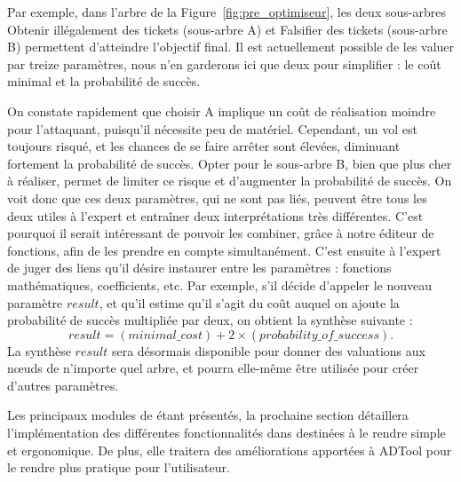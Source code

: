             Par exemple, dans l'arbre de la {\sc Figure}~\ref{fig:pre_optimiseur}, les deux sous-arbres \og Obtenir illégalement des tickets \fg{} (sous-arbre A) et \og Falsifier des tickets \fg{} (sous-arbre B) permettent d'atteindre l'objectif final. Il est actuellement possible de les valuer par treize paramètres, nous n'en garderons ici que deux pour simplifier : le coût minimal et la probabilité de succès.

            On constate rapidement que choisir A implique un coût de réalisation moindre pour l'attaquant, puisqu'il nécessite peu de matériel. Cependant, un vol est toujours risqué, et les chances de se faire arrêter sont élevées, diminuant fortement la probabilité de succès. Opter pour le sous-arbre B, bien que plus cher à réaliser, permet de limiter ce risque et d'augmenter la probabilité de succès. On voit donc que ces deux paramètres, qui ne sont pas liés, peuvent être tous les deux utiles à l'expert et entraîner deux interprétations très différentes. C'est pourquoi il serait intéressant de pouvoir les combiner, grâce à notre éditeur de fonctions, afin de les prendre en compte simultanément. C'est ensuite à l'expert de juger des liens qu'il désire instaurer entre les paramètres : fonctions mathématiques, coefficients, etc. Par exemple, s'il décide d'appeler le nouveau paramètre $result$, et qu'il estime qu'il s'agit du coût auquel on ajoute la probabilité de succès multipliée par deux, on obtient la synthèse suivante : \[ result = (minimal\_cost) + 2 \times (probability\_of\_success).\]
            La synthèse $result$ sera désormais disponible pour donner des valuations aux nœuds de n'importe quel arbre, et pourra elle-même être utilisée pour créer d'autres paramètres.

            Les principaux modules de \glasir{} étant présentés, la prochaine section détaillera l'implémentation des différentes fonctionnalités dans \glasir{} destinées à le rendre simple et ergonomique. De plus, elle traitera des améliorations apportées à ADTool pour le rendre plus pratique pour l'utilisateur.

